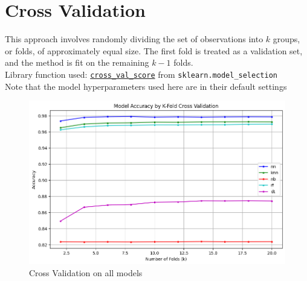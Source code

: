 \newpage
\section{Cross Validation}
This approach involves randomly dividing the set of observations into $k$ groups, or folds, of approximately equal size. The first fold is treated as a validation set, and the method is fit on the remaining $k-1$ folds.
\\
Library function used: \texttt{\href{https://scikit-learn.org/stable/modules/generated/sklearn.model_selection.cross_val_score.html}{cross\_val\_score}} from \texttt{sklearn.model\_selection}
\\
Note that the model hyperparameters used here are in their default settings
\begin{figure}[h!]
    \centering
    \includegraphics[width=1\linewidth]{images/kfold_CV.png}
    \caption{ Cross Validation on all models}
\end{figure}